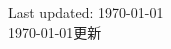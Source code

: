 \documentclass[12pt,a4paper]{article}
\newenvironment{item_list}{
 \begin{list}{}{
   \setlength{\leftmargin}{1.5em}
   \setlength{\itemsep}{0.25em}
   \setlength{\parskip}{0pt}
   \setlength{\parsep}{0.25em}
 }
}{
 \end{list}
}
\begin{document}




\begin{center}
  \begin{small}
    Last updated: \today \\
    \Chinesedate\today 更新 
  \end{small}
\end{center}
\end{document}
